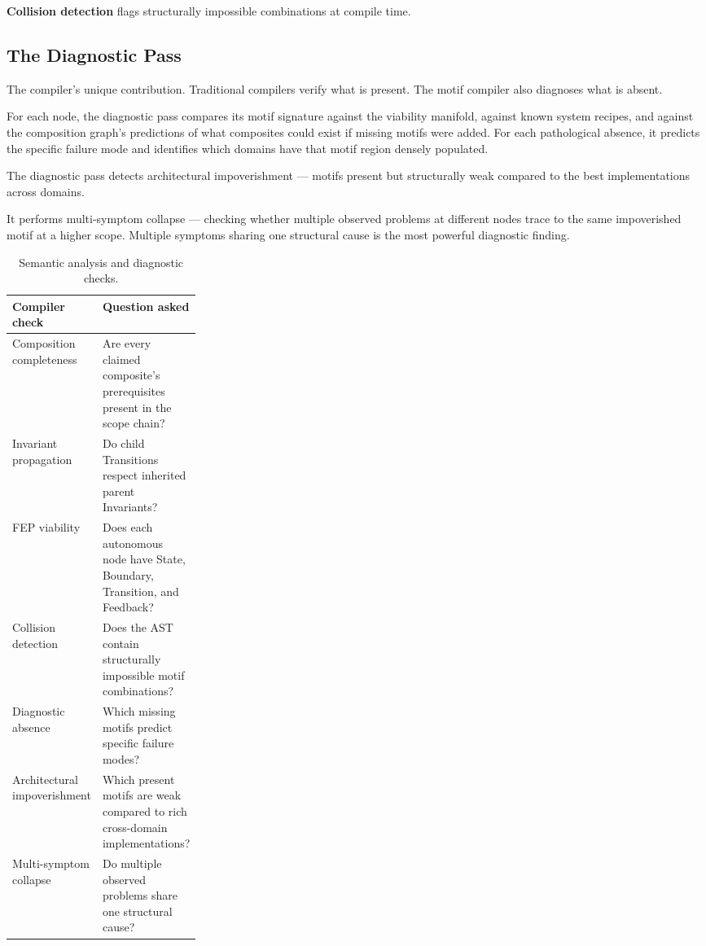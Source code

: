 \documentclass[11pt,a4paper]{article}
\begin{document}
\textbf{Collision detection} flags structurally impossible combinations at compile time.

\subsection{The Diagnostic Pass}

The compiler's unique contribution. Traditional compilers verify what is present. The motif compiler also diagnoses what is absent.

For each node, the diagnostic pass compares its motif signature against the viability manifold, against known system recipes, and against the composition graph's predictions of what composites could exist if missing motifs were added. For each pathological absence, it predicts the specific failure mode and identifies which domains have that motif region densely populated.

The diagnostic pass detects architectural impoverishment --- motifs present but structurally weak compared to the best implementations across domains.

It performs multi-symptom collapse --- checking whether multiple observed problems at different nodes trace to the same impoverished motif at a higher scope. Multiple symptoms sharing one structural cause is the most powerful diagnostic finding.

\begin{table}[ht]
\centering
\caption{Semantic analysis and diagnostic checks.}
\begin{tabularx}{\linewidth}{@{}L{0.27\linewidth}Y@{}}
\toprule
\textbf{Compiler check} & \textbf{Question asked} \\
\midrule
Composition completeness & Are every claimed composite's prerequisites present in the scope chain? \\
Invariant propagation & Do child Transitions respect inherited parent Invariants? \\
FEP viability & Does each autonomous node have State, Boundary, Transition, and Feedback? \\
Collision detection & Does the AST contain structurally impossible motif combinations? \\
Diagnostic absence & Which missing motifs predict specific failure modes? \\
Architectural impoverishment & Which present motifs are weak compared to rich cross-domain implementations? \\
Multi-symptom collapse & Do multiple observed problems share one structural cause? \\
\bottomrule
\end{tabularx}
\end{table}
\end{document}
